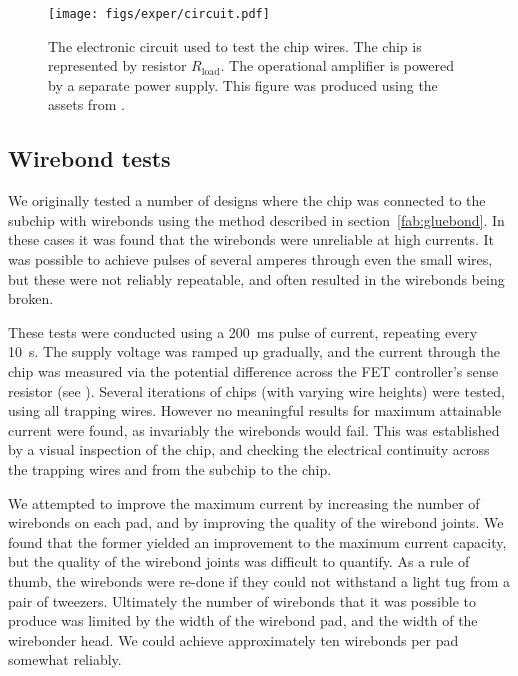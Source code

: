 \begin{figure}[htb]
  \centering
  \texttt{[image: figs/exper/circuit.pdf]}
  \caption[Current testing electronics]{
    The electronic circuit used to test the chip wires. The chip is
  represented by resistor $R_\text{load}$. The operational amplifier is powered
  by a separate power supply. This figure was produced using the assets from
  .}
  \label{exper:fig:curtest}
\end{figure}

\subsection{Wirebond tests}

We originally tested a number of designs where the chip was connected to the
subchip with wirebonds using the method described in
section~\ref{fab:gluebond}. In these cases it was found that the wirebonds were
unreliable at high currents. It was possible to achieve pulses of several
amperes through even the small wires, but these were not reliably repeatable,
and often resulted in the wirebonds being broken.

These tests were conducted using a \SI{200}{\milli\second} pulse of current,
repeating every \SI{10}{\second}. The supply voltage was ramped up gradually,
and the current through the chip was measured via the potential difference
across the FET controller's sense resistor (see ).
Several iterations of chips (with varying wire heights) were tested, using all
trapping wires. However no meaningful results for maximum attainable current
were found, as invariably the wirebonds would fail. This was established by a
visual inspection of the chip, and checking the electrical continuity across
the trapping wires and from the subchip to the chip.

We attempted to improve the maximum current by increasing the number of
wirebonds on each pad, and by improving the quality of the wirebond joints. We
found that the former yielded an improvement to the maximum current capacity,
but the quality of the wirebond joints was difficult to quantify. As a rule of
thumb, the wirebonds were re-done if they could not withstand a light tug from
a pair of tweezers. Ultimately the number of wirebonds that it was possible to
produce was limited by the width of the wirebond pad, and the width of the
wirebonder head. We could achieve approximately ten wirebonds per pad somewhat
reliably.

